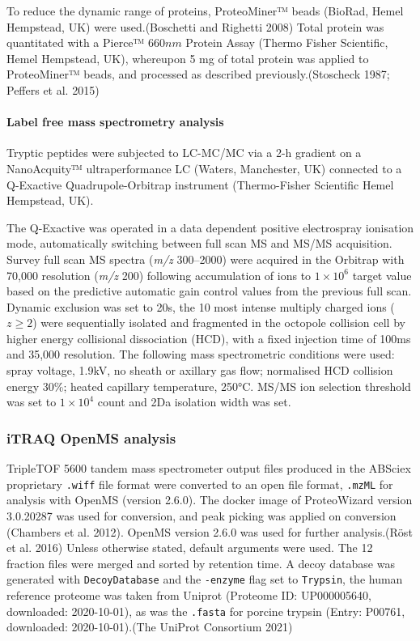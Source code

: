 \documentclass[9pt,lineno]{elife}
\begin{document}
To reduce the dynamic range of proteins, ProteoMiner™ beads (BioRad, Hemel Hempstead, UK) were used.(Boschetti and Righetti 2008)
Total protein was quantitated with a Pierce™ \(660 nm\) Protein Assay (Thermo Fisher Scientific, Hemel Hempstead, UK), whereupon 5 mg of total protein was applied to ProteoMiner™ beads, and processed as described previously.(Stoscheck 1987; Peffers et al. 2015)

\hypertarget{label-free-mass-spectrometry-analysis}{%
\paragraph{Label free mass spectrometry analysis}\label{label-free-mass-spectrometry-analysis}}

Tryptic peptides were subjected to LC-MC/MC via a 2-h gradient on a NanoAcquity™ ultraperformance LC (Waters, Manchester, UK) connected to a Q-Exactive Quadrupole-Orbitrap instrument (Thermo-Fisher Scientific Hemel Hempstead, UK).

The Q-Exactive was operated in a data dependent positive electrospray ionisation mode, automatically switching between full scan MS and MS/MS acquisition.
Survey full scan MS spectra (\emph{m/z} 300--2000) were acquired in the Orbitrap with 70,000 resolution (\emph{m/z} 200) following accumulation of ions to \(1\times 10^6\) target value based on the predictive automatic gain control values from the previous full scan.
Dynamic exclusion was set to 20s, the 10 most intense multiply charged ions (\(z \geq 2\)) were sequentially isolated and fragmented in the octopole collision cell by higher energy collisional dissociation (HCD), with a fixed injection time of 100ms and 35,000 resolution.
The following mass spectrometric conditions were used: spray voltage, 1.9kV, no sheath or axillary gas flow; normalised HCD collision energy 30\%; heated capillary temperature, 250°C.
MS/MS ion selection threshold was set to \(1\times 10^4\) count and 2Da isolation width was set.

\hypertarget{openms-chap3}{%
\subsubsection{iTRAQ OpenMS analysis}\label{openms-chap3}}

TripleTOF 5600 tandem mass spectrometer output files produced in the ABSciex proprietary \texttt{.wiff} file format were converted to an open file format, \texttt{.mzML} for analysis with OpenMS (version 2.6.0).
The docker image of ProteoWizard version 3.0.20287 was used for conversion, and peak picking was applied on conversion (Chambers et al. 2012).
OpenMS version 2.6.0 was used for further analysis.(Röst et al. 2016) Unless otherwise stated, default arguments were used.
The 12 fraction files were merged and sorted by retention time.
A decoy database was generated with \texttt{DecoyDatabase} and the \texttt{-enzyme} flag set to \texttt{Trypsin}, the human reference proteome was taken from Uniprot (Proteome ID: UP000005640, downloaded: 2020-10-01), as was the \texttt{.fasta} for porcine trypsin (Entry: P00761, downloaded: 2020-10-01).(The UniProt Consortium 2021)
\end{document}
